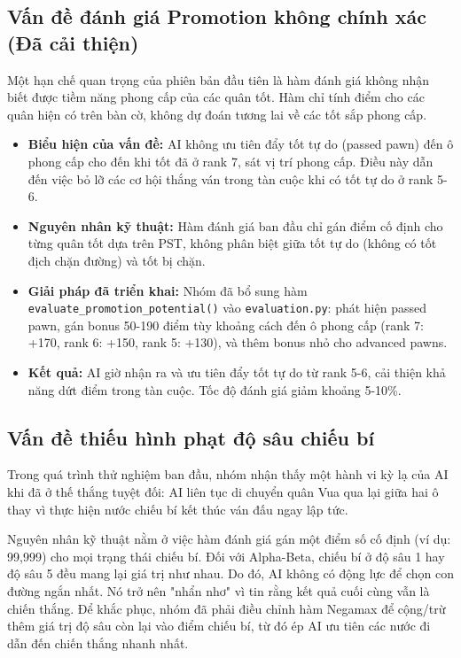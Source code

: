 \subsection{Vấn đề đánh giá Promotion không chính xác (Đã cải thiện)}

Một hạn chế quan trọng của phiên bản đầu tiên là hàm đánh giá không nhận biết được tiềm năng phong cấp của các quân tốt. Hàm chỉ tính điểm cho các quân hiện có trên bàn cờ, không dự đoán tương lai về các tốt sắp phong cấp.

\begin{itemize}
    \item \textbf{Biểu hiện của vấn đề:} AI không ưu tiên đẩy tốt tự do (passed pawn) đến ô phong cấp cho đến khi tốt đã ở rank 7, sát vị trí phong cấp. Điều này dẫn đến việc bỏ lỡ các cơ hội thắng ván trong tàn cuộc khi có tốt tự do ở rank 5-6.
    
    \item \textbf{Nguyên nhân kỹ thuật:} Hàm đánh giá ban đầu chỉ gán điểm cố định cho từng quân tốt dựa trên PST, không phân biệt giữa tốt tự do (không có tốt địch chặn đường) và tốt bị chặn.
    
    \item \textbf{Giải pháp đã triển khai:} Nhóm đã bổ sung hàm \texttt{evaluate\_promotion\_potential()} vào \texttt{evaluation.py}: phát hiện passed pawn, gán bonus 50-190 điểm tùy khoảng cách đến ô phong cấp (rank 7: +170, rank 6: +150, rank 5: +130), và thêm bonus nhỏ cho advanced pawns.
    
    \item \textbf{Kết quả:} AI giờ nhận ra và ưu tiên đẩy tốt tự do từ rank 5-6, cải thiện khả năng dứt điểm trong tàn cuộc. Tốc độ đánh giá giảm khoảng 5-10\%.
\end{itemize}

\subsection{Vấn đề thiếu hình phạt độ sâu chiếu bí}
Trong quá trình thử nghiệm ban đầu, nhóm nhận thấy một hành vi kỳ lạ của AI khi đã ở thế thắng tuyệt đối: AI liên tục di chuyển quân Vua qua lại giữa hai ô thay vì thực hiện nước chiếu bí kết thúc ván đấu ngay lập tức.

Nguyên nhân kỹ thuật nằm ở việc hàm đánh giá gán một điểm số cố định (ví dụ: 99,999) cho mọi trạng thái chiếu bí. Đối với Alpha-Beta, chiếu bí ở độ sâu 1 hay độ sâu 5 đều mang lại giá trị như nhau. Do đó, AI không có động lực để chọn con đường ngắn nhất. Nó trở nên "nhẩn nhơ" vì tin rằng kết quả cuối cùng vẫn là chiến thắng. Để khắc phục, nhóm đã phải điều chỉnh hàm Negamax để cộng/trừ thêm giá trị độ sâu còn lại vào điểm chiếu bí, từ đó ép AI ưu tiên các nước đi dẫn đến chiến thắng nhanh nhất.

